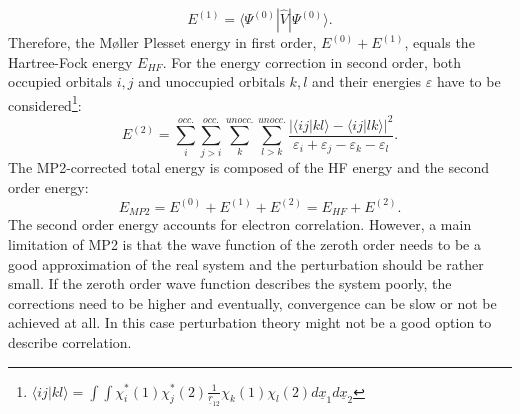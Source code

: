 \documentclass[11pt,DIV=13,BCOR=5mm,a4paper,headinclude]{scrbook}
\renewcommand{\vec}[1]{\underline{#1}}
\begin{document}
\begin{equation}
 E^{(1)} = \langle\Psi^{(0)}|\hat{V}|\Psi^{(0)}\rangle.
\end{equation}
Therefore, the M\o{}ller Plesset energy in first order, $E^{(0)}+E^{(1)}$, equals the Hartree-Fock energy $E_{HF}$.
For the energy correction in second order, both occupied orbitals $i,j$ and unoccupied orbitals $k,l$ and their energies $\varepsilon$ have to be considered\footnote{$\langle ij|kl\rangle=\int\int\chi^\ast_i(1)\chi^\ast_j(2)\frac{1}{\vec{r}_{12}}\chi_k(1)\chi_l(2) d\vec{x}_1d\vec{x}_2$}:
\begin{equation}
 E^{(2)}=\sum\limits_{i}^{occ.}\sum\limits_{j>i}^{occ.}\sum\limits_{k}^{unocc.}\sum\limits_{l>k}^{unocc.} \frac{|\langle ij|kl\rangle - \langle ij|lk\rangle|^2}{\varepsilon_i + \varepsilon_j - \varepsilon_k - \varepsilon_l}.
\end{equation}
The MP2-corrected total energy is composed of the HF energy and the second order energy:
\begin{equation}
 E_{MP2} = E^{(0)}+E^{(1)} + E^{(2)} = E_{HF} + E^{(2)}.
\end{equation}
The second order energy accounts for electron correlation.
However, a main limitation of MP2 is that the wave function of the zeroth order needs to be a good approximation of the real system and the perturbation should be rather small.
If the zeroth order wave function describes the system poorly, the corrections need to be higher and eventually, convergence can be slow or not be achieved at all.
In this case perturbation theory might not be a good option to describe correlation.

\end{document}
